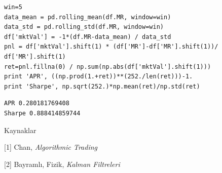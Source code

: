 \documentclass[12pt,fleqn]{article}\usepackage{../../common}
\begin{document}
\begin{verbatim}
win=5
data_mean = pd.rolling_mean(df.MR, window=win)
data_std = pd.rolling_std(df.MR, window=win)
df['mktVal'] = -1*(df.MR-data_mean) / data_std
pnl = df['mktVal'].shift(1) * (df['MR']-df['MR'].shift(1))/ df['MR'].shift(1)
ret=pnl.fillna(0) / np.sum(np.abs(df['mktVal'].shift(1)))
print 'APR', ((np.prod(1.+ret))**(252./len(ret)))-1.
print 'Sharpe', np.sqrt(252.)*np.mean(ret)/np.std(ret)
\end{verbatim}

\begin{verbatim}
APR 0.280181769408
Sharpe 0.888414859744
\end{verbatim}


Kaynaklar

[1] Chan, {\em Algorithmic Trading}

[2] Bayramlı, Fizik, {\em Kalman Filtreleri}
\end{document}
